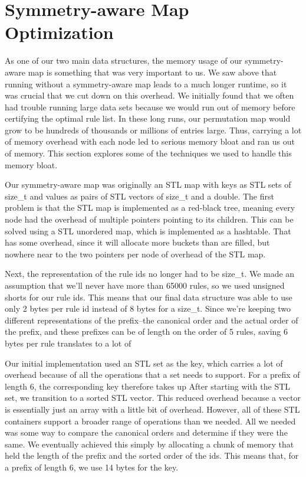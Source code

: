 \section{Symmetry-aware Map Optimization}

As one of our two main data structures, the memory usage of our symmetry-aware map is something that was very important to us.
We saw above that running without a symmetry-aware map leads to a much longer runtime, so it was crucial that we cut down on this overhead.
We initially found that we often had trouble running large data sets because we would run out of memory before certifying the optimal rule list.
In these long runs, our permutation map would grow to be hundreds of thousands or millions of entries large.
Thus, carrying a lot of memory overhead with each node led to serious memory bloat and ran us out of memory.
This section explores some of the techniques we used to handle this memory bloat.

Our symmetry-aware map was originally an STL map with keys as STL sets of size\_t and values as pairs of STL vectors of size\_t and a double.
The first problem is that the STL map is implemented as a red-black tree, meaning every node had the overhead of multiple pointers pointing to its children.
This can be solved using a STL unordered map, which is implemented as a hashtable.
That has some overhead, since it will allocate more buckets than are filled, but nowhere near to the two pointers per node of overhead of the STL map.

Next, the representation of the rule ids no longer had to be size\_t.
We made an assumption that we'll never have more than 65000 rules, so we used unsigned shorts for our rule ids.
This means that our final data structure was able to use only 2 bytes per rule id instead of 8 bytes for a size\_t.
Since we're keeping two different representations of the prefix--the canonical order and the actual order of the prefix, and these prefixes can be of length on the order of 5 rules, saving 6 bytes per rule translates to a lot of 

Our initial implementation used an STL set as the key, which carries a lot of overhead because of all the operations that a set needs to support.
For a prefix of length 6, the corresponding key therefore takes up 
After starting with the STL set, we transition to a sorted STL vector.
This reduced overhead because a vector is essentially just an array with a little bit of overhead.
However, all of these STL containers support a broader range of operations than we needed.
All we needed was some way to compare the canonical orders and determine if they were the same.
We eventually achieved this simply by allocating a chunk of memory that held the length of the prefix and the sorted order of the ids.
This means that, for a prefix of length 6, we use 14 bytes for the key.

